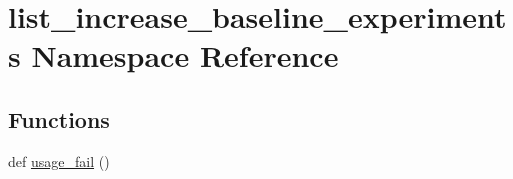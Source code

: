 \hypertarget{namespacelist__increase__baseline__experiments}{}\section{list\+\_\+increase\+\_\+baseline\+\_\+experiments Namespace Reference}
\label{namespacelist__increase__baseline__experiments}
\subsection*{Functions}
\begin{DoxyCompactItemize}
\item 
def \hyperlink{namespacelist__increase__baseline__experiments_ab6e8c70a5b8849d747eddf268c077881}{usage\+\_\+fail} ()
\end{DoxyCompactItemize}
